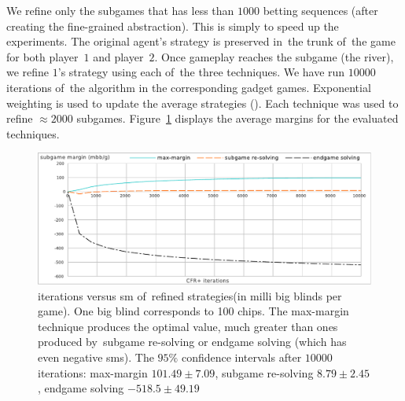 We refine only the subgames that has less than $1000$ betting sequences (after creating the fine-grained abstraction).
This is simply to speed up the experiments.
The original agent's strategy is preserved in~the trunk of~the game for both player~$1$ and player~$2$.
Once gameplay reaches the subgame (the river), we refine $1$'s strategy using each of~the three techniques.
We have run $10000$ iterations of~the \cfrplus algorithm in the corresponding gadget games.
Exponential weighting is used to update the average strategies (\cite{Tammelin2015solving}).
Each technique was used to refine $\approx 2000$ subgames.
Figure~\ref{fig:sm-experiments} displays the average margins for the evaluated techniques.

\begin{figure}[H]
  \centering
  \includegraphics[width=\textwidth]{../img/sm-experiments}
  \def\captionTitle{\cfrplus iterations versus \acrshort{sm} of~refined strategies}
  \caption[\captionTitle]{\captionTitle (in milli big blinds per game).
    One big blind corresponds to 100 chips.
    The max-margin technique produces the optimal value, much greater than ones produced by~subgame re-solving or endgame solving (which has even negative \acrshort{sm}s).
    The $95\%$ confidence intervals after $10000$ iterations:
    max-margin $101.49 \pm 7.09$, subgame re-solving $8.79 \pm 2.45$, endgame solving $-518.5 \pm 49.19$
  }
  \label{fig:sm-experiments}
\end{figure}
